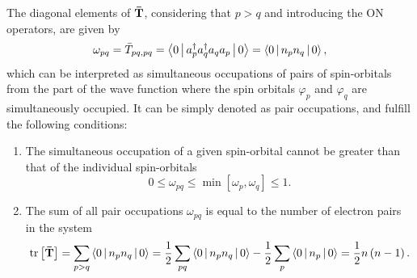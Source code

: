 The diagonal elements of $ \boldsymbol{\mathrm{\bar{T}}}$, considering that $p > q$ and introducing
the ON operators, are given by
\begin{equation}
    \omega_{pq} = \bar{T}_{pq,pq} =
    \Braket{0 | a_p^{\dagger} a_q^{\dagger} a_q a_p | 0} =
    \Braket{0 | n_p n_q | 0},
\end{equation}
which can be interpreted as simultaneous occupations of pairs of spin-orbitals
from the part of the wave function where the spin
orbitals $\varphi_p$ and $\varphi_q$ are simultaneously occupied.
It can be simply denoted as pair occupations, and fulfill the following conditions:
\begin{enumerate}
    \item The simultaneous occupation of a given spin-orbital cannot be greater than that
        of the individual spin-orbitals
        \begin{equation}
            0 \le \omega_{pq} \le \min\left[ \omega_p, \omega_q \right] \le 1
            .
        \end{equation}

    \item The sum of all pair occupations $\omega_{pq}$ is equal to the number of
        electron pairs in the system 
        \begin{equation}
            \trace \left[ \mat{\bar{T}} \right] =
            \sum_{p>q} \Braket{0 | n_p n_q | 0} =
            \frac{1}{2} \sum_{pq} \Braket{0 | n_p n_q | 0}
            - \frac{1}{2} \sum_{p} \Braket{0 | n_p | 0} =
            \frac{1}{2} n \left( n - 1 \right)
            .
        \end{equation}
\end{enumerate}

